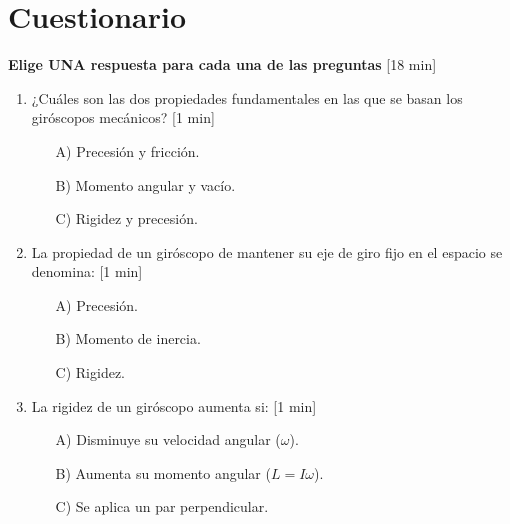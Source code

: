 
\chapter*{Cuestionario} %
\chapterspaceabove{6.75cm} %
\chapterspacebelow{7.25cm} %
\pagestyle{empty}
\begin{nosangria}
\Large{\textbf{Elige UNA respuesta para cada una de las preguntas} [18 min]}
\end{nosangria}

\begin{enumerate}
\item ¿Cuáles son las dos propiedades fundamentales en las que se basan los giróscopos mecánicos? [1 min]

	\begin{itemize}
		\item[A)] Precesión y fricción.
		\item[B)] Momento angular y vacío.
		\item[C)] Rigidez y precesión.\\
	\end{itemize}

\item La propiedad de un giróscopo de mantener su eje de giro fijo en el espacio se denomina: [1 min]

	\begin{itemize}
		\item[A)] Precesión.
		\item[B)] Momento de inercia.
		\item[C)] Rigidez.\\
	\end{itemize}

\item La rigidez de un giróscopo aumenta si: [1 min]

	\begin{itemize}
		\item[A)] Disminuye su velocidad angular (\(\omega\)).
		\item[B)] Aumenta su momento angular (\(L = I \omega\)).
		\item[C)] Se aplica un par perpendicular.\\
	\end{itemize}


\end{enumerate}
